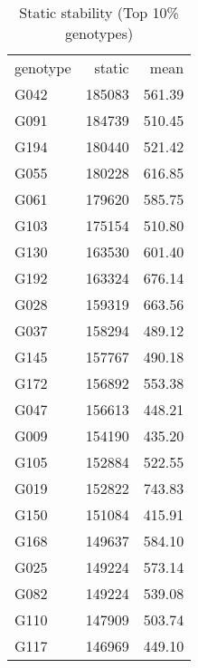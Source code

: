 \documentclass[a4paper,11pt]{article}\usepackage[]{graphicx}\usepackage[]{color}
\begin{document}
\begin{table}[ht]
\begin{flushleft}
\caption{Static stability (Top 10\% genotypes)} 
\label{static}
\begin{tabular}{lrr}
 genotype & static & mean \\ 
 G042 & 185083 & 561.39 \\ 
  G091 & 184739 & 510.45 \\ 
  G194 & 180440 & 521.42 \\ 
  G055 & 180228 & 616.85 \\ 
  G061 & 179620 & 585.75 \\ 
  G103 & 175154 & 510.80 \\ 
  G130 & 163530 & 601.40 \\ 
  G192 & 163324 & 676.14 \\ 
  G028 & 159319 & 663.56 \\ 
  G037 & 158294 & 489.12 \\ 
  G145 & 157767 & 490.18 \\ 
  G172 & 156892 & 553.38 \\ 
  G047 & 156613 & 448.21 \\ 
  G009 & 154190 & 435.20 \\ 
  G105 & 152884 & 522.55 \\ 
  G019 & 152822 & 743.83 \\ 
  G150 & 151084 & 415.91 \\ 
  G168 & 149637 & 584.10 \\ 
  G025 & 149224 & 573.14 \\ 
  G082 & 149224 & 539.08 \\ 
  G110 & 147909 & 503.74 \\ 
  G117 & 146969 & 449.10 \\ 
  \end{tabular}
\end{flushleft}
\end{table}
\end{document}
